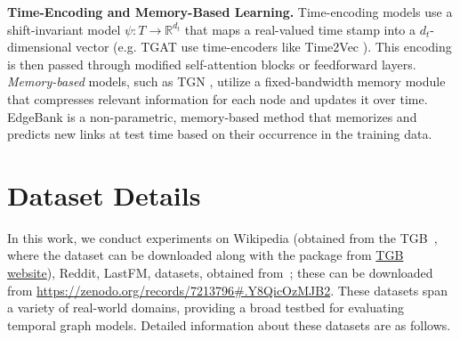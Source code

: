 \textbf{Time-Encoding and Memory-Based Learning.} Time-encoding models use a shift-invariant model $\psi: T \to \mathbb{R}^{d_t}$ that maps a real-valued time stamp into a $d_t$-dimensional vector (e.g. TGAT \cite{tgat} use time-encoders like Time2Vec \cite{time2vec}). This encoding is then passed through modified self-attention blocks or feedforward layers. \textit{Memory-based} models, such as TGN \cite{tgn}, utilize a fixed-bandwidth memory module that compresses relevant information for each node and updates it over time. EdgeBank \cite{edgebank} is a non-parametric, memory-based method that memorizes and predicts new links at test time based on their occurrence in the training data.




\section{Dataset Details} \label{app:data}

In this work, we conduct experiments on Wikipedia (obtained from the TGB~\cite{huang2023temporal}, where the dataset can be downloaded along with the package from \href{https://tgb.complexdatalab.com/}{TGB website}), Reddit, LastFM, datasets, obtained from~\cite{poursafaei2022towards}; these can be downloaded from \url{https://zenodo.org/records/7213796#.Y8QicOzMJB2}. 
These datasets span a variety of real-world domains, providing a broad testbed for evaluating temporal graph models.
Detailed information about these datasets are as follows.

